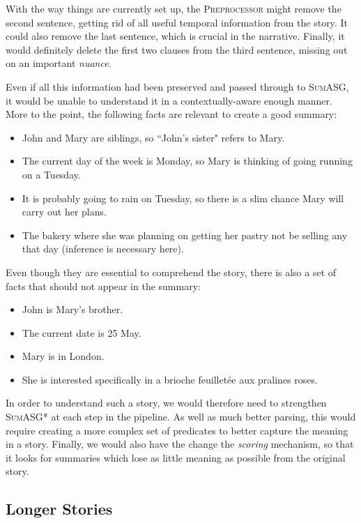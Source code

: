 \noindent
With the way things are currently set up, the \textsc{Preprocessor} might remove the second sentence, getting rid of all useful temporal information from the story. It could also remove the last sentence, which is crucial in the narrative. Finally, it would definitely delete the first two clauses from the third sentence, missing out on an important \textit{nuance}.

Even if all this information had been preserved and passed through to \textsc{SumASG}, it would be unable to understand it in a contextually-aware enough manner. More to the point, the following facts are relevant to create a good summary:

\begin{itemize}
\item John and Mary are siblings, so ``John's sister" refers to Mary.
\item The current day of the week is Monday, so Mary is thinking of going running on a Tuesday.
\item It is probably going to rain on Tuesday, so there is a slim chance Mary will carry out her plans.
\item The bakery where she was planning on getting her pastry not be selling any that day (inference is necessary here).
\end{itemize}

\noindent
Even though they are essential to comprehend the story, there is also a set of facts that should not appear in the summary:

\begin{itemize}
\item John is Mary's brother.
\item The current date is 25 May.
\item Mary is in London.
\item She is interested specifically in a brioche feuilletée aux pralines roses.
\end{itemize}

\noindent
In order to understand such a story, we would therefore need to strengthen \textsc{SumASG*} at each step in the pipeline. As well as much better parsing, this would require creating a more complex set of predicates to better capture the meaning in a story. Finally, we would also have the change the \textit{scoring} mechanism, so that it looks for summaries which lose as little meaning as possible from the original story.

\subsection{Longer Stories}

